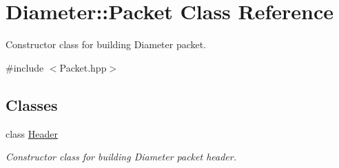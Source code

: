 \hypertarget{classDiameter_1_1Packet}{}\section{Diameter\+:\+:Packet Class Reference}
\label{classDiameter_1_1Packet}


Constructor class for building Diameter packet.  




{\ttfamily \#include $<$Packet.\+hpp$>$}

\subsection*{Classes}
\begin{DoxyCompactItemize}
\item 
class \hyperlink{classDiameter_1_1Packet_1_1Header}{Header}
\begin{DoxyCompactList}\small\item\em Constructor class for building Diameter packet header. \end{DoxyCompactList}\end{DoxyCompactItemize}
